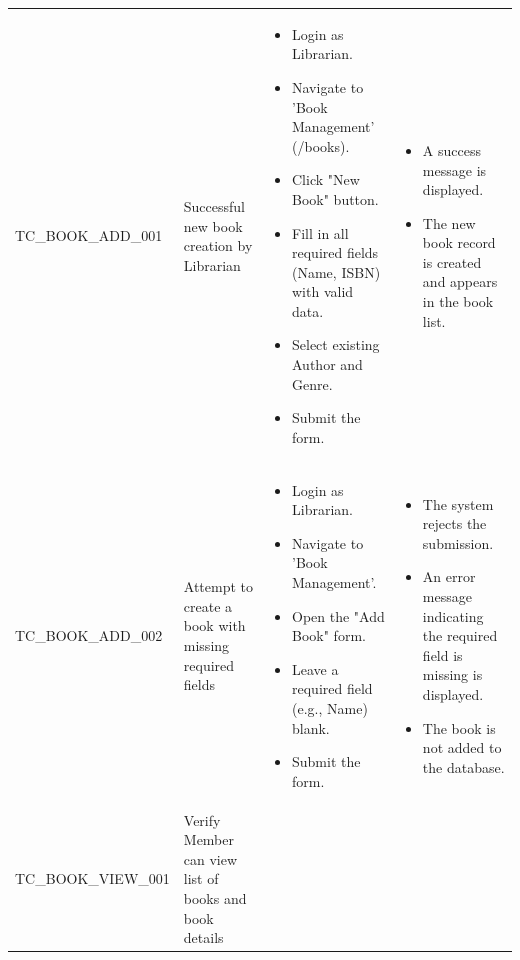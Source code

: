 \begin{longtable}{|>{\scriptsize\raggedright\arraybackslash}p{3.8cm}|>{\raggedright\arraybackslash}p{3.8cm}|>{\raggedright\arraybackslash}p{4cm}|>{\raggedright\arraybackslash}p{4cm}|}
\multicolumn{4}{|l|}{\textbf{Sub-Section: Book Management (CRUD)}} \\ \hline
TC\_BOOK\_ADD\_001 & Successful new book creation by Librarian &
    \begin{itemize}[noitemsep, topsep=0pt, partopsep=0pt, leftmargin=*]
        \item Login as Librarian.
        \item Navigate to 'Book Management' (/books).
        \item Click "New Book" button.
        \item Fill in all required fields (Name, ISBN) with valid data.
        \item Select existing Author and Genre.
        \item Submit the form.
    \end{itemize} &
    \begin{itemize}[noitemsep, topsep=0pt, partopsep=0pt, leftmargin=*]
        \item A success message is displayed.
        \item The new book record is created and appears in the book list.
    \end{itemize} \\ \hline
TC\_BOOK\_ADD\_002 & Attempt to create a book with missing required fields &
    \begin{itemize}[noitemsep, topsep=0pt, partopsep=0pt, leftmargin=*]
        \item Login as Librarian.
        \item Navigate to 'Book Management'.
        \item Open the "Add Book" form.
        \item Leave a required field (e.g., Name) blank.
        \item Submit the form.
    \end{itemize} &
    \begin{itemize}[noitemsep, topsep=0pt, partopsep=0pt, leftmargin=*]
        \item The system rejects the submission.
        \item An error message indicating the required field is missing is displayed.
        \item The book is not added to the database.
    \end{itemize} \\ \hline
TC\_BOOK\_VIEW\_001 & Verify Member can view list of books and book details &
    \begin{itemize}[noitemsep, topsep=0pt, partopsep=0pt, leftmargin=*]

\end{itemize}
\end{longtable}
